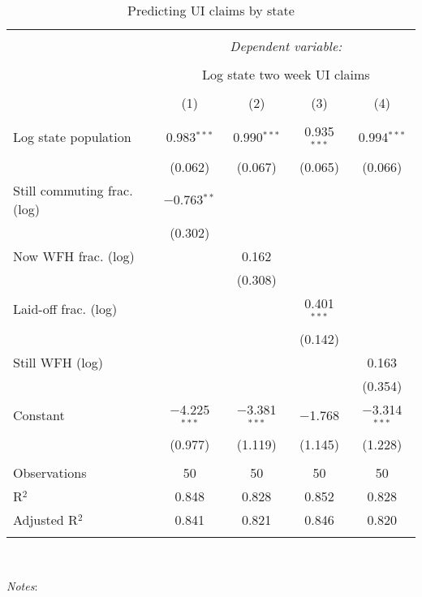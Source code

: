 
\begin{table}[!htbp] \centering 
  \caption{Predicting UI claims by state} 
  \label{tab:ui} 
\small 
\begin{tabular}{@{\extracolsep{5pt}}lcccc} 
\\[-1.8ex]\hline 
\hline \\[-1.8ex] 
 & \multicolumn{4}{c}{\textit{Dependent variable:}} \\ 
\cline{2-5} 
\\[-1.8ex] & \multicolumn{4}{c}{Log state two week UI claims} \\ 
\\[-1.8ex] & (1) & (2) & (3) & (4)\\ 
\hline \\[-1.8ex] 
 Log state population & 0.983$^{***}$ & 0.990$^{***}$ & 0.935$^{***}$ & 0.994$^{***}$ \\ 
  & (0.062) & (0.067) & (0.065) & (0.066) \\ 
  Still commuting frac. (log) & $-$0.763$^{**}$ &  &  &  \\ 
  & (0.302) &  &  &  \\ 
  Now WFH frac. (log) &  & 0.162 &  &  \\ 
  &  & (0.308) &  &  \\ 
  Laid-off frac. (log) &  &  & 0.401$^{***}$ &  \\ 
  &  &  & (0.142) &  \\ 
  Still WFH (log) &  &  &  & 0.163 \\ 
  &  &  &  & (0.354) \\ 
  Constant & $-$4.225$^{***}$ & $-$3.381$^{***}$ & $-$1.768 & $-$3.314$^{***}$ \\ 
  & (0.977) & (1.119) & (1.145) & (1.228) \\ 
 \hline \\[-1.8ex] 
Observations & 50 & 50 & 50 & 50 \\ 
R$^{2}$ & 0.848 & 0.828 & 0.852 & 0.828 \\ 
Adjusted R$^{2}$ & 0.841 & 0.821 & 0.846 & 0.820 \\ 
\hline 
\hline \\[-1.8ex] 
\end{tabular}
\\
\begin{minipage}{1.0 \textwidth}
{\footnotesize \emph{Notes}:
\starlanguage}
\end{minipage}
\end{table}